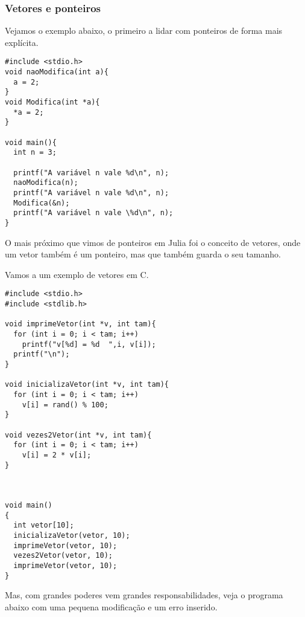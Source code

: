\documentclass[a4paper]{article}
\begin{document}
\subsubsection{Vetores e ponteiros}
\label{sec:org41f6957}

Vejamos o exemplo abaixo, o primeiro a lidar com ponteiros de forma
mais explícita.

\begin{verbatim}
#include <stdio.h>
void naoModifica(int a){
  a = 2;
}
void Modifica(int *a){
  *a = 2;
}  

void main(){
  int n = 3;

  printf("A variável n vale %d\n", n);
  naoModifica(n);
  printf("A variável n vale %d\n", n);
  Modifica(&n);
  printf("A variável n vale \%d\n", n);   
}    
\end{verbatim}

O mais próximo que vimos de ponteiros em Julia foi o
conceito de vetores, onde um vetor também é um ponteiro,
mas que também guarda o seu tamanho.

Vamos a um exemplo de vetores em C.

\begin{verbatim}
#include <stdio.h>
#include <stdlib.h>

void imprimeVetor(int *v, int tam){
  for (int i = 0; i < tam; i++)
    printf("v[%d] = %d  ",i, v[i]);
  printf("\n");
}

void inicializaVetor(int *v, int tam){
  for (int i = 0; i < tam; i++)
    v[i] = rand() % 100;
}

void vezes2Vetor(int *v, int tam){
  for (int i = 0; i < tam; i++)
    v[i] = 2 * v[i];
}



void main()
{
  int vetor[10];
  inicializaVetor(vetor, 10);
  imprimeVetor(vetor, 10);
  vezes2Vetor(vetor, 10);
  imprimeVetor(vetor, 10);  
}
\end{verbatim}

Mas, com grandes poderes vem grandes responsabilidades, veja o programa abaixo com
uma pequena modificação e um erro inserido.
\end{document}
